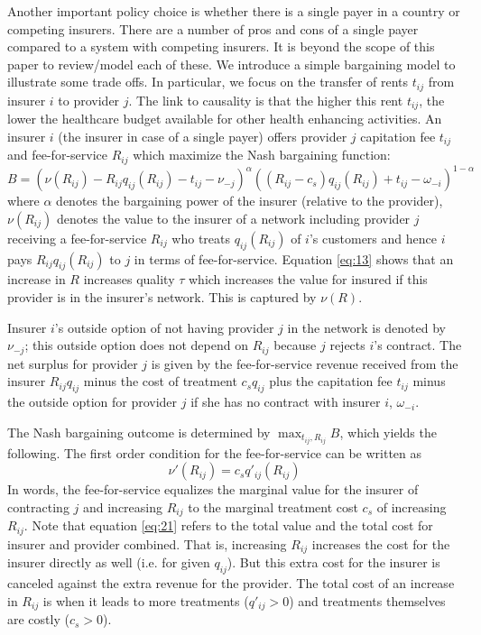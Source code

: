 \documentclass{article}
\begin{document}
Another important policy choice is whether there is a single payer in a country or competing insurers. There are a number of pros and cons of a single payer compared to a system with competing insurers. It is beyond the scope of this paper to review/model each of these. We introduce a simple bargaining model to illustrate some trade offs. In particular, we focus on the transfer of rents \(t_{ij}\) from insurer \(i\) to provider \(j\). The link to causality is that the higher this rent \(t_{ij}\), the lower the healthcare budget available for other health enhancing activities. An insurer \(i\) (the insurer in case of a single payer) offers provider \(j\) capitation fee \(t_{ij}\) and fee-for-service \(R_{ij}\) which maximize the Nash bargaining function:
\begin{equation}
\label{eq:7}
B = (\nu(R_{ij}) - R_{ij}q_{ij}(R_{ij}) - t_{ij} - \nu_{-j})^{\alpha}((R_{ij}-c_s)q_{ij}(R_{ij}) + t_{ij} - \omega_{-i})^{1-\alpha}
\end{equation}
where \(\alpha\) denotes the bargaining power of the insurer (relative to the provider), \(\nu(R_{ij})\) denotes the value to the insurer of a network including provider \(j\) receiving a fee-for-service \(R_{ij}\) who treats \(q_{ij}(R_{ij})\) of \(i\)'s customers and hence \(i\) pays \(R_{ij}q_{ij}(R_{ij})\) to \(j\) in terms of fee-for-service. Equation \eqref{eq:13} shows that an increase in \(R\) increases quality \(\tau\) which increases the value for insured if this provider is in the insurer's network. This is captured by \(\nu(R)\).

Insurer \(i\)'s outside option of not having provider \(j\) in the network is denoted by \(\nu_{-j}\); this outside option does not depend on \(R_{ij}\) because \(j\) rejects \(i\)'s contract. The net surplus for provider \(j\) is given by the fee-for-service revenue received from the insurer \(R_{ij}q_{ij}\) minus the cost of treatment \(c_s q_{ij}\) plus the capitation fee \(t_{ij}\) minus the outside option for provider \(j\) if she has no contract with insurer \(i\), \(\omega_{-i}\).

The Nash bargaining outcome is determined by \(\max_{t_{ij},R_{ij}} B\), which yields the following. The first order condition for the fee-for-service can be written as
\begin{equation}
\label{eq:21}
\nu'(R_{ij}) = c_s q'_{ij}(R_{ij})
\end{equation}
In words, the fee-for-service equalizes the marginal value for the insurer of contracting \(j\) and increasing \(R_{ij}\) to the marginal treatment cost \(c_s\) of increasing \(R_{ij}\). Note that equation \eqref{eq:21} refers to the total value and the total cost for insurer and provider combined. That is, increasing \(R_{ij}\) increases the cost for the insurer directly as well (i.e. for given \(q_{ij}\)). But this extra cost for the insurer is canceled against the extra revenue for the provider. The total cost of an increase in \(R_{ij}\) is when it leads to more treatments (\(q'_{ij}>0\)) and treatments themselves are costly (\(c_s > 0\)). 
\end{document}
